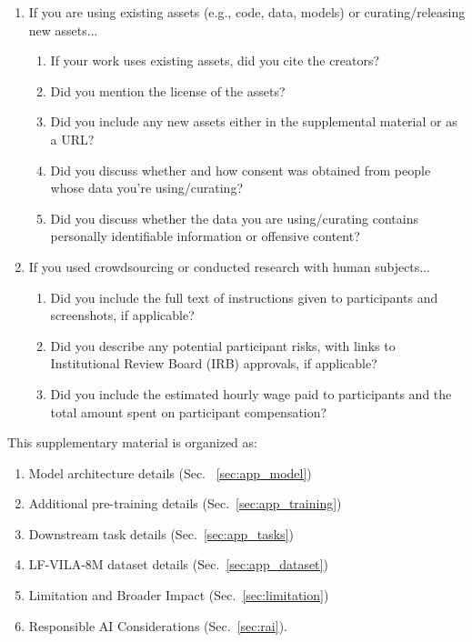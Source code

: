 \documentclass{article}
\begin{document}
\begin{enumerate}
\item If you are using existing assets (e.g., code, data, models) or curating/releasing new assets...
\begin{enumerate}
  \item If your work uses existing assets, did you cite the creators?
    \answerYes{}
  \item Did you mention the license of the assets?
    \answerNo{}
  \item Did you include any new assets either in the supplemental material or as a URL?
    \answerNo{}
  \item Did you discuss whether and how consent was obtained from people whose data you're using/curating?
    \answerNo{}
  \item Did you discuss whether the data you are using/curating contains personally identifiable information or offensive content?
    \answerYes{}
\end{enumerate}


\item If you used crowdsourcing or conducted research with human subjects...
\begin{enumerate}
  \item Did you include the full text of instructions given to participants and screenshots, if applicable?
    \answerNA{}
  \item Did you describe any potential participant risks, with links to Institutional Review Board (IRB) approvals, if applicable?
    \answerNA{}
  \item Did you include the estimated hourly wage paid to participants and the total amount spent on participant compensation?
    \answerNA{}
\end{enumerate}


\end{enumerate}


%
 
\appendix



This supplementary material is organized as:

\begin{enumerate}
    \item Model architecture details (Sec. ~\ref{sec:app_model})
    \item Additional pre-training details (Sec.~\ref{sec:app_training})
    \item Downstream task details (Sec.~\ref{sec:app_tasks})
    \item LF-VILA-8M dataset details (Sec.~\ref{sec:app_dataset})
    \item Limitation and Broader Impact (Sec.~\ref{sec:limitation})
    \item Responsible AI Considerations (Sec.~\ref{sec:rai}).
    
\end{enumerate}
\end{document}

